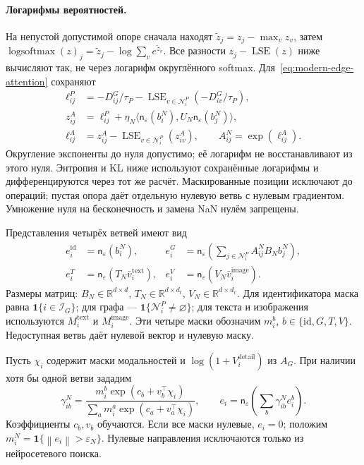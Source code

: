 \documentclass[12pt,a4paper]{article}
\newcommand{\R}{\mathbb R}
\newcommand{\ind}{\mathbf 1}
\newcommand{\eps}{\varepsilon}
\newcommand{\norm}[1]{\left\lVert#1\right\rVert}
\theoremstyle{plainru}
\begin{document}
\paragraph{Логарифмы вероятностей.}\label{sec:modern-log-probabilities}
На непустой допустимой опоре сначала находят
$\widetilde z_j=z_j-\max_v z_v$, затем
$\operatorname{logsoftmax}(z)_j=\widetilde z_j-\log\sum_v e^{\widetilde z_v}$.
Все разности $z_j-\operatorname{LSE}(z)$ ниже вычисляют так,
не через логарифм округлённого softmax.
Для~\eqref{eq:modern-edge-attention} сохраняют
\begin{align}\label{eq:modern-edge-log-probabilities}
\ell_{ij}^{P}&=-D_{ij}^{G}/\tau_P
-\operatorname{LSE}_{v\in\mathcal N_i^P}(-D_{iv}^{G}/\tau_P),\\
z_{ij}^{A}&=\ell_{ij}^{P}+\eta_N\langle
\mathsf n_\eps(b_i^N),U_N\mathsf n_\eps(b_j^N)\rangle,\nonumber\\
\ell_{ij}^{A}&=z_{ij}^{A}
-\operatorname{LSE}_{v\in\mathcal N_i^P}(z_{iv}^{A}),\qquad
A_{ij}^N=\exp(\ell_{ij}^{A}).\nonumber
\end{align}
Округление экспоненты до нуля допустимо; её логарифм не восстанавливают
из этого нуля. Энтропия и KL ниже используют сохранённые логарифмы
и дифференцируются через тот же расчёт. Маскированные позиции исключают
до операций; пустая опора даёт отдельную нулевую ветвь с нулевым
градиентом. Умножение нуля на бесконечность и замена NaN нулём запрещены.

Представления четырёх ветвей имеют вид
\begin{align}\label{eq:modern-item-branches}
e_i^{\mathrm{id}}&=\mathsf n_\eps(b_i^N),&
e_i^{G}&=\mathsf n_\eps\!\left(
\sum_{j\in\mathcal N_i^P}A_{ij}^{N}B_Nb_j^N\right),\\
e_i^{T}&=\mathsf n_\eps(T_N\bar v_i^{\mathrm{text}}),&
e_i^{V}&=\mathsf n_\eps(V_N\bar v_i^{\mathrm{image}}).
\nonumber
\end{align}
Размеры матриц: $B_N\in\R^{d\times d}$,
$T_N\in\R^{d\times d_t}$, $V_N\in\R^{d\times d_v}$.
Для идентификатора маска равна $\ind\{i\in\mathcal I_G\}$;
для графа --- $\ind\{\mathcal N_i^P\ne\varnothing\}$;
для текста и изображения используются $M_i^{\mathrm{text}}$
и $M_i^{\mathrm{image}}$. Эти четыре маски обозначим $m_i^b$,
$b\in\{\mathrm{id},G,T,V\}$.
Недоступная ветвь даёт нулевой вектор и нулевую маску.

Пусть $\chi_i$ содержит маски модальностей и
$\log(1+V_i^{\mathrm{detail}})$ из $A_G$.
При наличии хотя бы одной ветви зададим
\begin{equation}\label{eq:modern-item-fusion}
\gamma_{ib}^{N}=
\frac{m_i^b\exp(c_b+v_b^\top\chi_i)}
{\sum_a m_i^a\exp(c_a+v_a^\top\chi_i)},\qquad
e_i=\mathsf n_\eps\!\left(\sum_b\gamma_{ib}^{N}e_i^b\right).
\end{equation}
Коэффициенты $c_b,v_b$ обучаются. Если все маски нулевые,
$e_i=0$; положим $m_i^N=\ind\{\norm{e_i}>\eps_N\}$.
Нулевые направления исключаются только из нейросетевого поиска.
\end{document}
